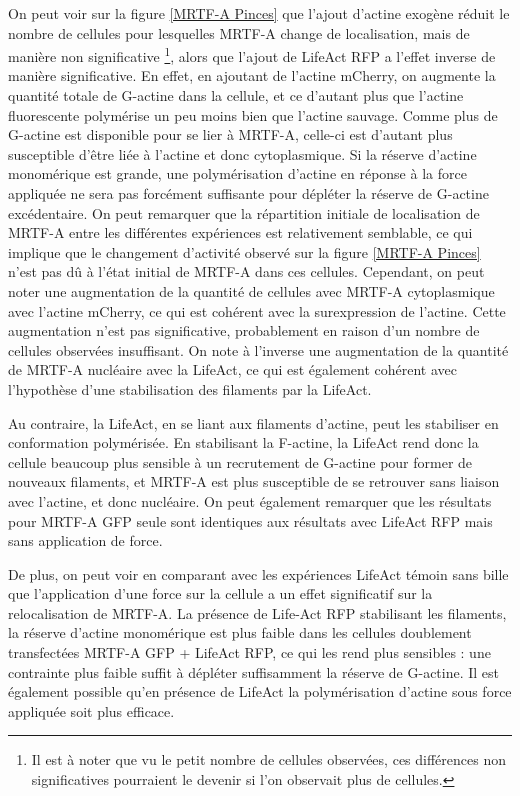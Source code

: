 On peut voir sur la figure \ref{MRTF-A Pinces} que l'ajout d'actine exogène réduit le nombre de cellules pour lesquelles MRTF-A change de localisation, mais de manière non significative  \footnote{ Il est à noter que vu le petit nombre de cellules observées, ces différences non significatives pourraient le devenir si l'on observait plus de cellules. }, alors que l'ajout de LifeAct RFP a l'effet inverse de manière significative.
En effet, en ajoutant de l'actine mCherry, on augmente la quantité totale de G-actine dans la cellule, et ce d'autant plus que l'actine fluorescente polymérise un peu moins bien que l'actine sauvage. Comme plus de G-actine est disponible pour se lier à MRTF-A, celle-ci est d'autant plus susceptible d'être liée à l'actine et donc cytoplasmique. 
Si la réserve d'actine monomérique est grande, une polymérisation d'actine en réponse à la force appliquée ne sera pas forcément suffisante pour dépléter la réserve de G-actine excédentaire.
On peut remarquer que la répartition initiale de localisation de MRTF-A entre les différentes expériences est relativement semblable, ce qui implique que le changement d'activité observé sur la figure \ref{MRTF-A Pinces} n'est pas dû à l'état initial de MRTF-A dans ces cellules. 
Cependant, on peut noter une augmentation de la quantité de cellules avec MRTF-A cytoplasmique avec l'actine mCherry, ce qui est cohérent avec la surexpression de l'actine. Cette augmentation n'est pas significative, probablement en raison d'un nombre de cellules observées insuffisant. On note à l'inverse une augmentation de la quantité de MRTF-A nucléaire avec la LifeAct, ce qui est également cohérent avec l'hypothèse d'une stabilisation des filaments par la LifeAct. 

Au contraire, la LifeAct, en se liant aux filaments d'actine, peut les stabiliser en conformation polymérisée. En stabilisant la F-actine, la LifeAct rend donc la cellule beaucoup plus sensible à un recrutement de G-actine pour former de nouveaux filaments, et MRTF-A est plus susceptible de se retrouver sans liaison avec l'actine, et donc nucléaire.
On peut également remarquer que les résultats pour MRTF-A GFP seule sont identiques aux résultats avec LifeAct RFP mais sans application de force. 

De plus, on peut voir en comparant avec les expériences LifeAct témoin sans bille que l'application d'une force sur la cellule a un effet significatif sur la relocalisation de MRTF-A. 
La présence de Life-Act RFP stabilisant les filaments, la réserve d'actine monomérique est plus faible dans les cellules doublement transfectées MRTF-A GFP + LifeAct RFP, ce qui les rend plus sensibles : une contrainte plus faible suffit à dépléter suffisamment la réserve de G-actine. Il est également possible qu’en présence de LifeAct la polymérisation d’actine sous force appliquée soit plus efficace.

